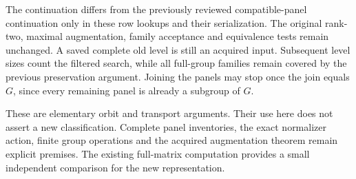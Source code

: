 \documentclass[11pt]{article}
\begin{document}
The continuation differs from the previously reviewed compatible-panel
continuation only in these row lookups and their serialization. The
original rank-two, maximal augmentation, family acceptance and equivalence
tests remain unchanged. A saved complete old level is still an acquired
input. Subsequent level sizes count the filtered search, while all
full-group families remain covered by the previous preservation argument.
Joining the panels may stop once the join equals $G$, since every
remaining panel is already a subgroup of $G$.

These are elementary orbit and transport arguments. Their use here does
not assert a new classification. Complete panel inventories, the exact
normalizer action, finite group operations and the acquired augmentation
theorem remain explicit premises. The existing full-matrix computation
provides a small independent comparison for the new representation.
\end{document}
